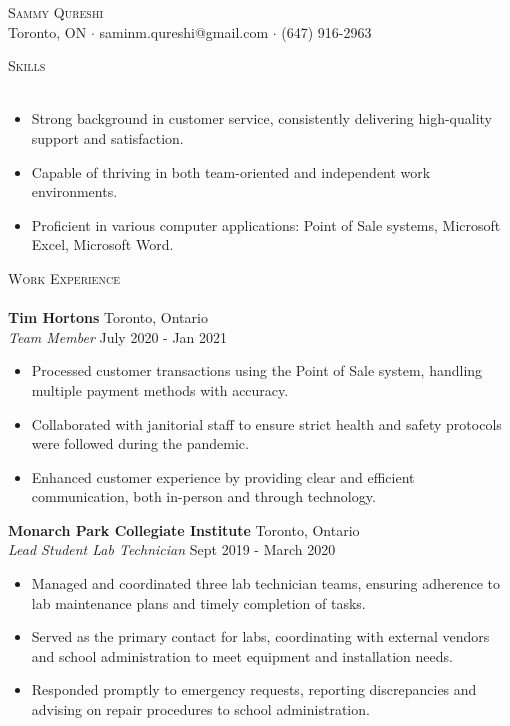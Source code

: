 \documentclass[12pt,a4paper]{article}
\newcommand{\lineunder} {
    \vspace*{-8pt} \\
    \hspace*{-18pt} \hrulefill \\
}
\newcommand{\header} [1] {
    {\hspace*{-18pt}\vspace*{6pt} \textsc{#1}}
    \vspace*{-6pt} \lineunder
}
\begin{document}
\vspace*{-40pt}

\vspace*{-10pt}
\begin{center}
	{\Huge \scshape {Sammy Qureshi}}\\
	Toronto, ON $\cdot$ saminm.qureshi@gmail.com $\cdot$ (647) 916-2963 \\
\end{center}

\header{Skills}
\begin{itemize}
    \item Strong background in customer service, consistently delivering high-quality support and satisfaction.
    \item Capable of thriving in both team-oriented and independent work environments.
    \item Proficient in various computer applications: Point of Sale systems, Microsoft Excel, Microsoft Word.
\end{itemize}
\vspace{4mm}

\header{Work Experience}

\textbf{Tim Hortons} \hfill Toronto, Ontario\\
\textit{Team Member} \hfill July 2020 - Jan 2021\\
\vspace{-1mm}
\begin{itemize} \itemsep 1pt
	\item Processed customer transactions using the Point of Sale system, handling multiple payment methods with accuracy.
	\item Collaborated with janitorial staff to ensure strict health and safety protocols were followed during the pandemic.
	\item Enhanced customer experience by providing clear and efficient communication, both in-person and through technology.
\end{itemize}

\textbf{Monarch Park Collegiate Institute} \hfill Toronto, Ontario\\
\textit{Lead Student Lab Technician} \hfill Sept 2019 - March 2020\\
\vspace{-1mm}
\begin{itemize} \itemsep 1pt
	\item Managed and coordinated three lab technician teams, ensuring adherence to lab maintenance plans and timely completion of tasks.
	\item Served as the primary contact for labs, coordinating with external vendors and school administration to meet equipment and installation needs.
	\item Responded promptly to emergency requests, reporting discrepancies and advising on repair procedures to school administration.
\end{itemize}
\vspace{4mm}
\end{document}
